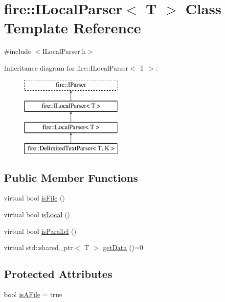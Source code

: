 \hypertarget{a00019}{}\section{fire\+:\+:I\+Local\+Parser$<$ T $>$ Class Template Reference}
\label{a00019}


{\ttfamily \#include $<$I\+Local\+Parser.\+h$>$}

Inheritance diagram for fire\+:\+:I\+Local\+Parser$<$ T $>$\+:\begin{figure}[H]
\begin{center}
\leavevmode
\includegraphics[height=4.000000cm]{a00019}
\end{center}
\end{figure}
\subsection*{Public Member Functions}
\begin{DoxyCompactItemize}
\item 
virtual bool \hyperlink{a00019_a091d5cf56bf8f407854ef87f460b2958}{is\+File} ()
\item 
virtual bool \hyperlink{a00019_a770acae6e216de3a9c7140a12de25d58}{is\+Local} ()
\item 
virtual bool \hyperlink{a00019_ad46898c516adcce38acbb4800dc9777b}{is\+Parallel} ()
\item 
virtual std\+::shared\+\_\+ptr$<$ T $>$ \hyperlink{a00019_a0fc1446d106f0ab8daf8744a4bd29a65}{get\+Data} ()=0
\end{DoxyCompactItemize}
\subsection*{Protected Attributes}
\begin{DoxyCompactItemize}
\item 
bool \hyperlink{a00019_a39adf288ae0bc79cf39fd6e4638858cf}{is\+A\+File} = true
\end{DoxyCompactItemize}


